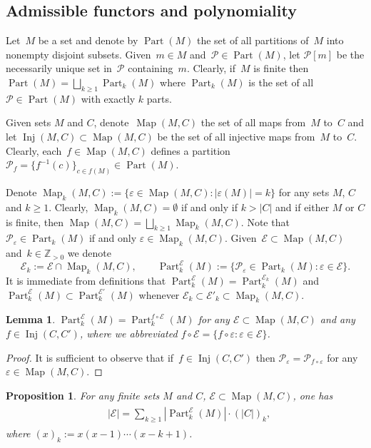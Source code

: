 \documentclass[12pt, reqno]{amsart}
\newtheorem{lemma}[theorem]{Lemma}
\newtheorem{proposition}[theorem]{Proposition}
\theoremstyle{definition}
\numberwithin{equation}{section}
\newcommand{\ZZ}{{\mathbb Z}}
\DeclareMathOperator{\Inj}{Inj}
\DeclareMathOperator{\Map}{Map}
\DeclareMathOperator{\Part}{Part}
\newcommand{\EE}{{\mathcal{E}}}
\newcommand{\PP}{{\mathcal {P}}}
\begin{document}
\subsection{Admissible functors and polynomiality}\label{subs:polynom}
Let~$M$ be a set and 
denote by $\Part(M)$ the set of all partitions of~$M$ into nonempty disjoint subsets. Given~$m\in M$ and~$\mathcal P\in 
\Part(M)$, let $\mathcal P[m]$ be the necessarily unique set in~$\mathcal P$
containing~$m$. 
Clearly, if~$M$ is finite then $\Part(M)=\bigsqcup\limits_{k\ge 1} \Part_k(M)$ where  $\Part_k(M)$ is the set of all 
$\PP\in \Part(M)$ with exactly $k$ parts.

Given sets $M$ and $C$,  
denote~$\Map(M,C)$ the set of all maps from~$M$ to~$C$ and let $\Inj(M,C)\subset \Map(M,C)$
be the set of all injective maps from~$M$
to~$C$.
Clearly,
each~$f\in \Map(M,C)$ defines a partition $\PP_f=\{f^{-1}(c)\}_{c\in f(M)}\in\Part(M)$. 


Denote $\Map_k(M,C):=\{\varepsilon\in \Map(M,C) : |\varepsilon(M)|=k\}$ for any  sets $M$, $C$ and $k\ge 1$. Clearly,  $\Map_k(M,C)=\emptyset$ if and only if $k>|C|$ and if either $M$ or $C$ is finite, then $\Map(M,C)=\bigsqcup\limits_{k\ge 1} \Map_k(M,C)$. Note that $\PP_\varepsilon\in \Part_k(M)$ if and only $\varepsilon\in \Map_k(M,C)$.
Given~$\EE\subset\Map(M,C)$ and~$k\in\ZZ_{>0}$ we denote $$
\EE_k:=\EE\cap \Map_k(M,C),\qquad \Part_k^\EE(M):=\{\PP_\varepsilon\in \Part_k(M) : \varepsilon \in \EE\}.
$$
It is immediate from definitions that $\Part_k^\EE(M)=\Part_k^{\EE_k}(M)$ and $\Part_k^\EE(M)\subset \Part_k^{\EE'}(M)$ whenever $\EE_k\subset \EE'_k\subset \Map_k(M,C)$.

\begin{lemma} 
\label{le:injective equality}
$\Part_k^\EE(M)=\Part_k^{f\circ \EE}(M)$ for any $\EE\subset \Map(M,C)$ and any $f\in \Inj(C,C')$, where we abbreviated $f\circ \EE=\{f\circ \varepsilon : \varepsilon \in \EE\}$. 
\end{lemma} 
\begin{proof}
It is sufficient to observe that if~$f\in\Inj(C,C')$ then $\PP_\varepsilon=\PP_{f\circ \varepsilon}$ for any $\varepsilon\in \Map(M,C)$.
\end{proof}

\begin{proposition}\label{prop:general enumeration} For any finite sets $M$ and $C$, $\EE\subset \Map(M,C)$, one has
\begin{align}
\label{eq:general enumeration}
\begin{split}
& |\EE|=\sum_{k\ge 1} |\Part_k^\EE(M)|\cdot (|C|)_k,
\end{split}
\end{align}
where $(x)_k := x(x-1) \cdots (x-k+1)$. 
\end{proposition}
\end{document}
